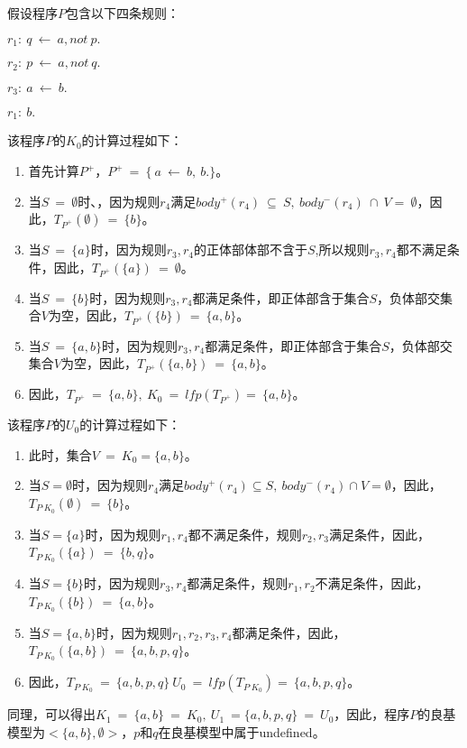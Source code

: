 \begin{example}
假设程序$P$包含以下四条规则：

$r_1: \ q \ \leftarrow \ a,not \ p.$

$r_2: \ p \ \leftarrow \ a,not \ q.$

$r_3: \ a \ \leftarrow \ b.$

$r_1: \ b.$

该程序$P$的$K_0$的计算过程如下：
\begin{enumerate}[label=(\arabic*),topsep=0pt]
    \setlength\itemsep{-0.3em}
    \item 首先计算$P^+$，$P^+ \ = \ \{\ a \ \leftarrow \ b,  \ b.\}$。
    \item 当$S \ =\ \emptyset$时、，因为规则$r_4$满足$body^+(r_4) \ \subseteq\ S, \  body^-(r_4) \ \cap\ V = \ \emptyset$，因此，$T_{P^+}(\emptyset) \ = \ \{b\}$。
    \item 当$S \ = \ \{a\}$时，因为规则$r_3,r_4$的正体部体部不含于$S$,所以规则$r_3,r_4$都不满足条件，因此，$T_{P^+}(\{a\}) \ = \ \emptyset$。
    \item 当$S \ = \ \{b\}$时，因为规则$r_3,r_4$都满足条件，即正体部含于集合$S$，负体部交集合$V$为空，因此，$T_{P^+}(\{b\}) \ = \ \{a,b\}$。
    \item 当$S \ =\ \{a,b\}$时，因为规则$r_3,r_4$都满足条件，即正体部含于集合$S$，负体部交集合$V$为空，因此，$T_{P^+}(\{a,b\}) \ = \ \{a,b\}$。
    \item 因此，$T_{P^+} \ = \ \{a,b\}, \ K_0 \ = \ lfp(T_{P^+}) = \ \{a,b\}$。
\end{enumerate}
该程序$P$的$U_0$的计算过程如下：
\begin{enumerate}[label=(\arabic*),topsep=0pt]
    \setlength\itemsep{-0.3em}
    \item 此时，集合$V \ = \ K_0 =  \{a,b\}$。
    \item 当$S = \emptyset$时，因为规则$r_4$满足$body^+(r_4) \subseteq S, \  body^-(r_4) \cap V = \emptyset$，因此，$T_{P^,K_0}(\emptyset) \ = \ \{b\}$。
    \item 当$S = \{a\}$时，因为规则$r_1,r_4$都不满足条件，规则$r_2,r_3$满足条件，因此，$T_{P^,K_0}(\{a\}) \ = \ \{b,q\}$。
    \item 当$S = \{b\}$时，因为规则$r_3,r_4$都满足条件，规则$r_1,r_2$不满足条件，因此，$T_{P^,K_0}(\{b\}) \ = \ \{a,b\}$。
    \item 当$S = \{a,b\}$时，因为规则$r_1,r_2,r_3,r_4$都满足条件，因此，$T_{P^,K_0}(\{a,b\}) \ = \ \{a,b,p,q\}$。
    \item 因此，$T_{P^,K_0} \ = \ \{a,b,p,q\} \ U_0 \ = \ lfp(T_{P^,K_0}) = \ \{a,b,p,q\}$。
\end{enumerate}
同理，可以得出$K_1 \  = \ \{a,b\} \ = \ K_0, \ U_1 \ = \{a,b,p,q\} \ = \ U_0$，因此，程序$P$的良基模型为$<\{a,b\},\emptyset>$，$p$和$q$在良基模型中属于undefined。
\end{example}



